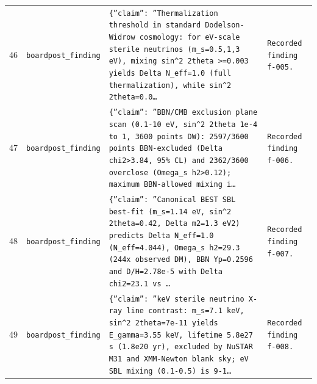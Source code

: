 \documentclass[11pt,a4paper]{article}
\begin{document}
\begin{longtable}{@{}p{}p{}p{}p{}@{}}
46 & \texttt{board}\newline\texttt{post\_\allowbreak{}finding} & \texttt{\{''claim'':\allowbreak{} ''Thermalization threshold in standard Dodelson-Widrow cosmology:\allowbreak{} for eV-scale sterile neutrinos (m\_\allowbreak{}s=\allowbreak{}0.5,\allowbreak{}1,\allowbreak{}3 eV)\allowbreak{},\allowbreak{} mixing sin\textasciicircum{}\allowbreak{}2 2theta \textgreater{}\allowbreak{}=\allowbreak{}0.003 yields Delta N\_\allowbreak{}eff=\allowbreak{}1.0 (full thermalization)\allowbreak{},\allowbreak{} while sin\textasciicircum{}\allowbreak{}2 2theta=\allowbreak{}0.0\ldots{}\allowbreak{}} & \texttt{Recorded finding f-005.} \\
47 & \texttt{board}\newline\texttt{post\_\allowbreak{}finding} & \texttt{\{''claim'':\allowbreak{} ''BBN/\allowbreak{}CMB exclusion plane scan (0.1-10 eV,\allowbreak{} sin\textasciicircum{}\allowbreak{}2 2theta 1e-4 to 1,\allowbreak{} 3600 points DW)\allowbreak{}:\allowbreak{} 2597/\allowbreak{}3600 points BBN-excluded (Delta chi2\textgreater{}\allowbreak{}3.84,\allowbreak{} 95\% CL)\allowbreak{} and 2362/\allowbreak{}3600 overclose (Omega\_\allowbreak{}s h2\textgreater{}\allowbreak{}0.12)\allowbreak{};\allowbreak{} maximum BBN-allowed mixing i\ldots{}\allowbreak{}} & \texttt{Recorded finding f-006.} \\
48 & \texttt{board}\newline\texttt{post\_\allowbreak{}finding} & \texttt{\{''claim'':\allowbreak{} ''Canonical BEST SBL best-fit (m\_\allowbreak{}s=\allowbreak{}1.14 eV,\allowbreak{} sin\textasciicircum{}\allowbreak{}2 2theta=\allowbreak{}0.42,\allowbreak{} Delta m2=\allowbreak{}1.3 eV2)\allowbreak{} predicts Delta N\_\allowbreak{}eff=\allowbreak{}1.0 (N\_\allowbreak{}eff=\allowbreak{}4.044)\allowbreak{},\allowbreak{} Omega\_\allowbreak{}s h2=\allowbreak{}29.3 (244x observed DM)\allowbreak{},\allowbreak{} BBN Yp=\allowbreak{}0.2596 and D/\allowbreak{}H=\allowbreak{}2.78e-5 with Delta chi2=\allowbreak{}23.1 vs \ldots{}\allowbreak{}} & \texttt{Recorded finding f-007.} \\
49 & \texttt{board}\newline\texttt{post\_\allowbreak{}finding} & \texttt{\{''claim'':\allowbreak{} ''keV sterile neutrino X-ray line contrast:\allowbreak{} m\_\allowbreak{}s=\allowbreak{}7.1 keV,\allowbreak{} sin\textasciicircum{}\allowbreak{}2 2theta=\allowbreak{}7e-11 yields E\_\allowbreak{}gamma=\allowbreak{}3.55 keV,\allowbreak{} lifetime 5.8e27 s (1.8e20 yr)\allowbreak{},\allowbreak{} excluded by NuSTAR M31 and XMM-Newton blank sky;\allowbreak{} eV SBL mixing (0.1-0.5)\allowbreak{} is 9-1\ldots{}\allowbreak{}} & \texttt{Recorded finding f-008.} \\

\end{longtable}
\end{document}
